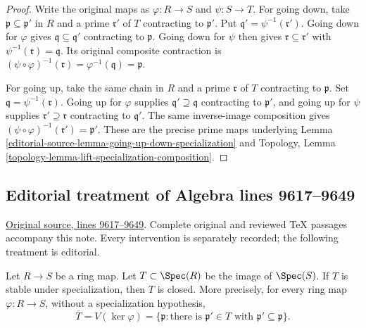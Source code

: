\begin{proof}
Write the original maps as $\varphi:R\to S$ and
$\psi:S\to T$. For going down, take
$\mathfrak p\subseteq\mathfrak p'$ in $R$ and a prime
$\mathfrak r'$ of $T$ contracting to $\mathfrak p'$.
Put $\mathfrak q'=\psi^{-1}(\mathfrak r')$.
Going down for $\varphi$ gives
$\mathfrak q\subseteq\mathfrak q'$ contracting to
$\mathfrak p$. Going down for $\psi$ then gives
$\mathfrak r\subseteq\mathfrak r'$ with
$\psi^{-1}(\mathfrak r)=\mathfrak q$. Its original
composite contraction is
$(\psi\circ\varphi)^{-1}(\mathfrak r)
=\varphi^{-1}(\mathfrak q)=\mathfrak p$.

For going up, take the same chain in $R$ and a prime
$\mathfrak r$ of $T$ contracting to $\mathfrak p$.
Set $\mathfrak q=\psi^{-1}(\mathfrak r)$.
Going up for $\varphi$ supplies
$\mathfrak q'\supseteq\mathfrak q$ contracting to
$\mathfrak p'$, and going up for $\psi$ supplies
$\mathfrak r'\supseteq\mathfrak r$ contracting to
$\mathfrak q'$. The same inverse-image composition gives
$(\psi\circ\varphi)^{-1}(\mathfrak r')=\mathfrak p'$.
These are the precise prime maps underlying
Lemma \ref{editorial-source-lemma-going-up-down-specialization} and
Topology, Lemma \ref{topology-lemma-lift-specialization-composition}.
\end{proof}


\subsection{Editorial treatment of Algebra lines 9617--9649}

\hypertarget{algebra-context-108}{}

\noindent\href{https://github.com/stacks/stacks-project/blob/a04446e57ec1fbc252a871afcec7752fb2807b14/algebra.tex\#L9617}{Original source, lines 9617--9649}. Complete original and reviewed TeX passages accompany this note. Every intervention is separately recorded; the following treatment is editorial.


\begin{lemma}
\label{editorial-source-lemma-image-stable-specialization-closed}
Let $R \to S$ be a ring map. Let $T \subset \Spec(R)$
be the image of $\Spec(S)$. If $T$ is stable under specialization,
then $T$ is closed. More precisely, for every ring map
$\varphi:R\to S$, without a specialization hypothesis,
$$
\overline T=V(\ker\varphi)
=\{\mathfrak p:\text{there is }\mathfrak p'\in T
\text{ with }\mathfrak p'\subseteq\mathfrak p\}.
$$
\end{lemma}

